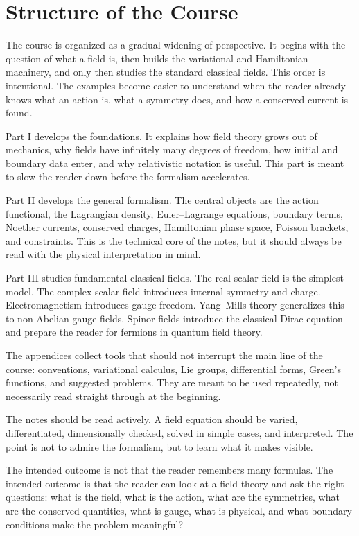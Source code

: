 \section{Structure of the Course}

The course is organized as a gradual widening of perspective. It begins with the
question of what a field is, then builds the variational and Hamiltonian
machinery, and only then studies the standard classical fields. This order is
intentional. The examples become easier to understand when the reader already
knows what an action is, what a symmetry does, and how a conserved current is
found.

Part I develops the foundations. It explains how field theory grows out of
mechanics, why fields have infinitely many degrees of freedom, how initial and
boundary data enter, and why relativistic notation is useful. This part is meant
to slow the reader down before the formalism accelerates.

Part II develops the general formalism. The central objects are the action
functional, the Lagrangian density, Euler--Lagrange equations, boundary terms,
Noether currents, conserved charges, Hamiltonian phase space, Poisson brackets,
and constraints. This is the technical core of the notes, but it should always
be read with the physical interpretation in mind.

Part III studies fundamental classical fields. The real scalar field is the
simplest model. The complex scalar field introduces internal symmetry and charge.
Electromagnetism introduces gauge freedom. Yang--Mills theory generalizes this to
non-Abelian gauge fields. Spinor fields introduce the classical Dirac equation and
prepare the reader for fermions in quantum field theory.

The appendices collect tools that should not interrupt the main line of the
course: conventions, variational calculus, Lie groups, differential forms,
Green's functions, and suggested problems. They are meant to be used repeatedly,
not necessarily read straight through at the beginning.

\begin{remarkbox}
The notes should be read actively. A field equation should be varied,
differentiated, dimensionally checked, solved in simple cases, and interpreted.
The point is not to admire the formalism, but to learn what it makes visible.
\end{remarkbox}

The intended outcome is not that the reader remembers many formulas. The intended
outcome is that the reader can look at a field theory and ask the right
questions: what is the field, what is the action, what are the symmetries, what
are the conserved quantities, what is gauge, what is physical, and what boundary
conditions make the problem meaningful?
